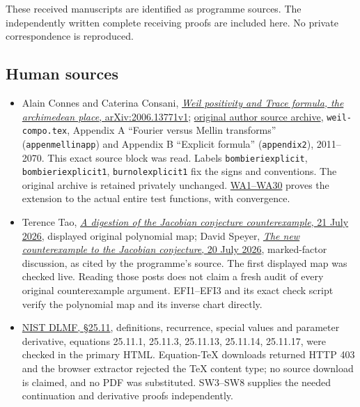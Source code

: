 \documentclass[
  10pt,
  a4paper,
]{article}
\providecommand{\tightlist}{%
  \setlength{\itemsep}{0pt}\setlength{\parskip}{0pt}}
\begin{document}
These received manuscripts are identified as programme sources. The
independently written complete receiving proofs are included here. No
private correspondence is reproduced.

\subsection{Human sources}\label{human-sources}

\begin{itemize}
\tightlist
\item
  Alain Connes and Caterina Consani,
  \href{https://arxiv.org/abs/2006.13771v1}{\emph{Weil positivity and
  Trace formula, the archimedean place}, arXiv:2006.13771v1};
  \href{https://arxiv.org/src/2006.13771v1}{original author source
  archive}, \texttt{weil-\allowbreak{}compo.\allowbreak{}tex}, Appendix A ``Fourier versus Mellin
  transforms'' (\texttt{appenmellinapp}) and Appendix B ``Explicit
  formula'' (\texttt{appendix2}), 2011--2070. This exact source block
  was read. Labels \texttt{bombieriexplicit},
  \texttt{bombieriexplicit1}, \texttt{burnolexplicit1} fix the signs and
  conventions. The original archive is retained privately unchanged.
  \href{https://github.com/KokunoYumeto/zeta-function-research-reader/blob/173dbc6ed5a03235dbe7654f928f3692107db39b/workbenches/splitzero-tandem/branches/tau-zero-prime-positivity/WEIL_PACKET_ANALYTIC_DERIVATION.md}{WA1--WA30}
  proves the extension to the actual entire test functions, with
  convergence.
\item
  Terence Tao,
  \href{https://terrytao.wordpress.com/2026/07/21/a-digestion-of-the-jacobian-conjecture-counterexample/}{\emph{A
  digestion of the Jacobian conjecture counterexample}, 21 July 2026},
  displayed original polynomial map; David Speyer,
  \href{https://sbseminar.wordpress.com/2026/07/20/the-new-counterexample-to-the-jacobian-conjecture/}{\emph{The
  new counterexample to the Jacobian conjecture}, 20 July 2026},
  marked-factor discussion, as cited by the programme's source. The
  first displayed map was checked live. Reading those posts does not
  claim a fresh audit of every original counterexample argument.
  EFI1--EFI3 and its exact check script verify the polynomial map and
  its inverse chart directly.
\item
  \href{https://dlmf.nist.gov/25.11}{NIST DLMF, §25.11}, definitions,
  recurrence, special values and parameter derivative, equations
  25.11.1, 25.11.3, 25.11.13, 25.11.14, 25.11.17, were checked in the
  primary HTML. Equation-TeX downloads returned HTTP 403 and the browser
  extractor rejected the TeX content type; no source download is
  claimed, and no PDF was substituted. SW3--SW8 supplies the needed
  continuation and derivative proofs independently.
\end{itemize}
\end{document}
